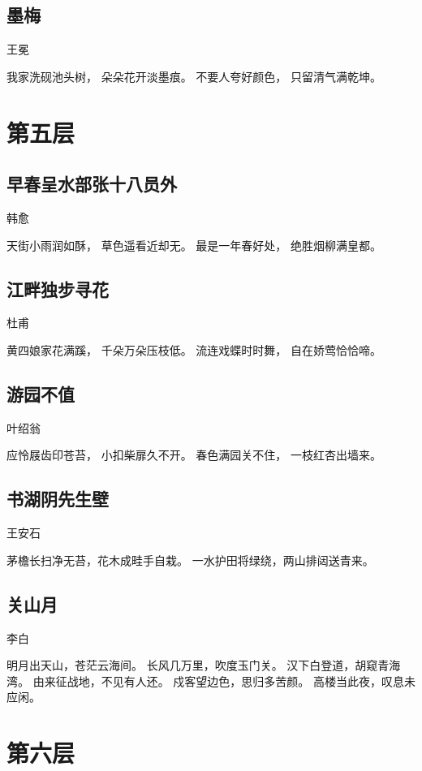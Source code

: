 \documentclass[12pt,UTF8]{ctexbook}
\begin{document}
\section{墨梅}

王冕

我家洗砚池头树，
朵朵花开淡墨痕。
不要人夸好颜色，
只留清气满乾坤。

\chapter{第五层}

\section{早春呈水部张十八员外}

韩愈

天街小雨润如酥，
草色遥看近却无。 
最是一年春好处，
绝胜烟柳满皇都。

\section{江畔独步寻花}

杜甫

黄四娘家花满蹊，
千朵万朵压枝低。
流连戏蝶时时舞，
自在娇莺恰恰啼。

\section{游园不值}

叶绍翁

应怜屐齿印苍苔，
小扣柴扉久不开。
春色满园关不住，
一枝红杏出墙来。

\section{书湖阴先生壁}

王安石

茅檐长扫净无苔，花木成畦手自栽。
一水护田将绿绕，两山排闼送青来。

\section{关山月}

李白

明月出天山，苍茫云海间。
长风几万里，吹度玉门关。
汉下白登道，胡窥青海湾。
由来征战地，不见有人还。
戍客望边色，思归多苦颜。
高楼当此夜，叹息未应闲。

\chapter{第六层}
\end{document}
